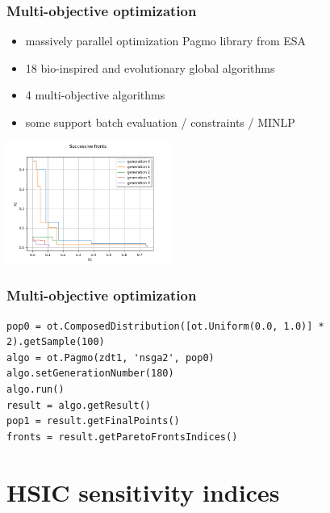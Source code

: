 \documentclass[aspectratio=169]{beamer}
\begin{document}
\begin{frame}[containsverbatim]
\frametitle{Multi-objective optimization}

% 

\begin{itemize}
\item massively parallel optimization Pagmo library from ESA
\item 18 bio-inspired and evolutionary global algorithms
\item 4 multi-objective algorithms
\item some support batch evaluation / constraints / MINLP
\end{itemize}

\begin{center}
\includegraphics[width=0.4\textwidth]{figures/sphx_glr_plot_optimization_pagmo_002.png}
\end{center}
\end{frame}


\begin{frame}[containsverbatim]
\frametitle{Multi-objective optimization}

\lstset{language=python}
\begin{lstlisting}
pop0 = ot.ComposedDistribution([ot.Uniform(0.0, 1.0)] * 2).getSample(100)
algo = ot.Pagmo(zdt1, 'nsga2', pop0)
algo.setGenerationNumber(180)
algo.run()
result = algo.getResult()
pop1 = result.getFinalPoints()
fronts = result.getParetoFrontsIndices()
\end{lstlisting}


\end{frame}


\section{HSIC sensitivity indices}
\end{document}

